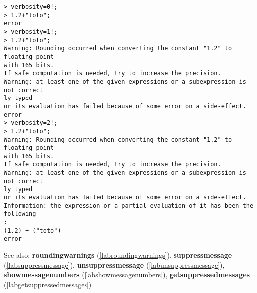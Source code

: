 \begin{center}\begin{minipage}{15cm}\begin{Verbatim}[frame=single]
> verbosity=0!;
> 1.2+"toto";
error
> verbosity=1!;
> 1.2+"toto";
Warning: Rounding occurred when converting the constant "1.2" to floating-point 
with 165 bits.
If safe computation is needed, try to increase the precision.
Warning: at least one of the given expressions or a subexpression is not correct
ly typed
or its evaluation has failed because of some error on a side-effect.
error
> verbosity=2!;
> 1.2+"toto";
Warning: Rounding occurred when converting the constant "1.2" to floating-point 
with 165 bits.
If safe computation is needed, try to increase the precision.
Warning: at least one of the given expressions or a subexpression is not correct
ly typed
or its evaluation has failed because of some error on a side-effect.
Information: the expression or a partial evaluation of it has been the following
:
(1.2) + ("toto")
error
\end{Verbatim}
\end{minipage}\end{center}
See also: \textbf{roundingwarnings} (\ref{labroundingwarnings}), \textbf{suppressmessage} (\ref{labsuppressmessage}), \textbf{unsuppressmessage} (\ref{labunsuppressmessage}), \textbf{showmessagenumbers} (\ref{labshowmessagenumbers}), \textbf{getsuppressedmessages} (\ref{labgetsuppressedmessages})
